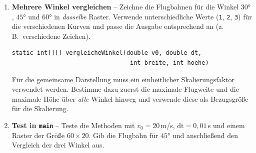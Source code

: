 \documentclass[
	fontsize=12pt,          %
	paper=a4,               %
	numbers=noenddot,       %
	listof=totoc,           %
	listof=entryprefix,     %
	listof=nochaptergap,    %
	bibliography=totoc,     %
	parskip=half            %
	openany                 %
]{scrbook}
\begin{document}
\begin{enumerate}[label=\textbf{\alph*)}]
\begin{beispiel}[Mögliche Ausgabe ($v_0 = 20$, $\alpha = 45°$, Raster $60 \times 20$)]
\begin{verbatim}
  *                                   *

 *                                     *

*                                       *
\end{verbatim}
\end{beispiel}

\item \textbf{Mehrere Winkel vergleichen} -- Zeichne die Flugbahnen für die Winkel $30°$, $45°$ und $60°$ in \emph{dasselbe} Raster. Verwende unterschiedliche Werte (\texttt{1}, \texttt{2}, \texttt{3}) für die verschiedenen Kurven und passe die Ausgabe entsprechend an (z.\,B.\ verschiedene Zeichen).

\begin{lstlisting}
static int[][] vergleicheWinkel(double v0, double dt,
                                 int breite, int hoehe)
\end{lstlisting}

\begin{hinweis}
	Für die gemeinsame Darstellung muss ein einheitlicher Skalierungsfaktor verwendet werden. Bestimme dazu zuerst die maximale Flugweite und die maximale Höhe über \emph{alle} Winkel hinweg und verwende diese als Bezugsgröße für die Skalierung.
\end{hinweis}

\item \textbf{Test in \texttt{main}} -- Teste die Methoden mit $v_0 = 20$\,m/s, $\text{dt} = 0{,}01$\,s und einem Raster der Größe $60 \times 20$. Gib die Flugbahn für $45°$ und anschließend den Vergleich der drei Winkel aus.

\end{enumerate}
\end{document}
